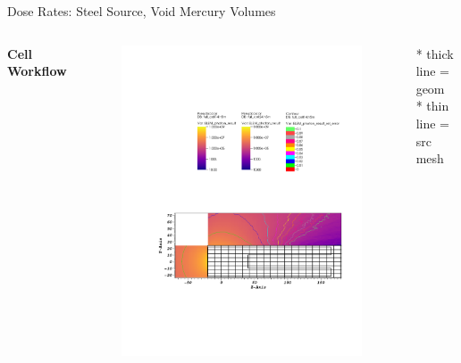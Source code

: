 \documentclass{beamer}
\begin{document}
\begin{frame}{Dose Rates: Steel Source, Void Mercury Volumes}
\begin{columns}[T]
        \textbf{Cell Workflow}
        \begin{figure}
                \centering
                \includegraphics[scale=0.49,trim={2.5cm 6cm 1cm 15cm},clip]{figs/dose_steel_cell_void.pdf}
        \end{figure}


	\tiny{* thick line = geom} \\
	\tiny{* thin line = src mesh}


\end{columns}
\end{frame}
\end{document}
